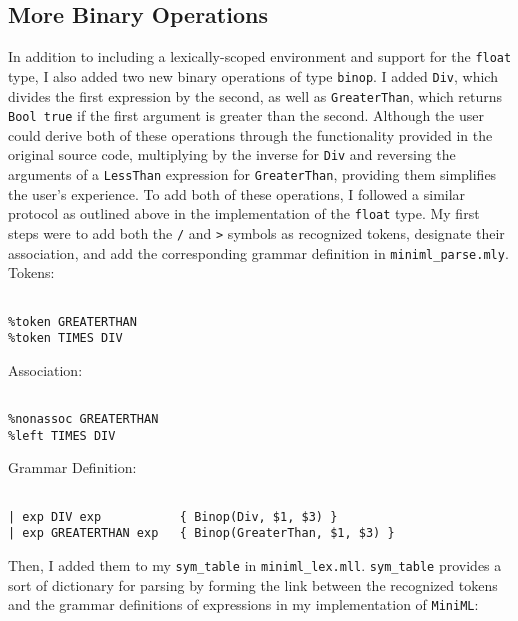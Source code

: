 \documentclass{report}
\begin{document}
\subsection{More Binary Operations}
In addition to including a lexically-scoped environment and support for the \texttt{float} type, I also added two new binary operations of type \texttt{binop}. I added \texttt{Div}, which divides the first expression by the second, as well as \texttt{GreaterThan}, which returns \texttt{Bool true} if the first argument is greater than the second. Although the user could derive both of these operations through the functionality provided in the original source code, multiplying by the inverse for \texttt{Div} and reversing the arguments of a \texttt{LessThan} expression for \texttt{GreaterThan}, providing them simplifies the user's experience.
\newline \newline
To add both of these operations, I followed a similar protocol as outlined above in the implementation of the \texttt{float} type. My first steps were to add both the \texttt{/} and \texttt{>} symbols as recognized tokens, designate their association, and add the corresponding grammar definition in \texttt{miniml_parse.mly}.
\newline \newline
Tokens:
\begin{verbatim}

%token GREATERTHAN
%token TIMES DIV

\end{verbatim}
\newline \newline
Association:
\begin{verbatim}

%nonassoc GREATERTHAN
%left TIMES DIV

\end{verbatim}
\newline \newline
Grammar Definition:
\begin{verbatim}

| exp DIV exp           { Binop(Div, $1, $3) }
| exp GREATERTHAN exp   { Binop(GreaterThan, $1, $3) }

\end{verbatim}
\newline \newline
Then, I added them to my \texttt{sym_table} in \texttt{miniml_lex.mll}. \texttt{sym_table} provides a sort of dictionary for parsing by forming the link between the recognized tokens and the grammar definitions of expressions in my implementation of \texttt{MiniML}:
\end{document}
